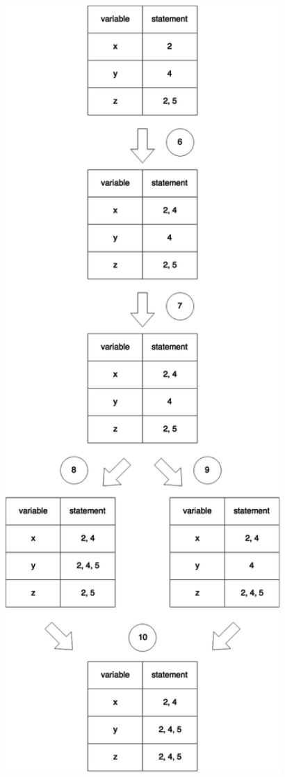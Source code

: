 \documentclass[12pt]{article}
\begin{document}
{{{{{{{{{{{{{{\begin{center}
\noindent
\begin{minipage}{15em}
\begin{flushleft}
\noindent
\includegraphics[width=1.15\textwidth]{affects2.png}

\end{flushleft}
\end{minipage}
\end{center}}}}}}}}}}}}}}}
\end{document}
